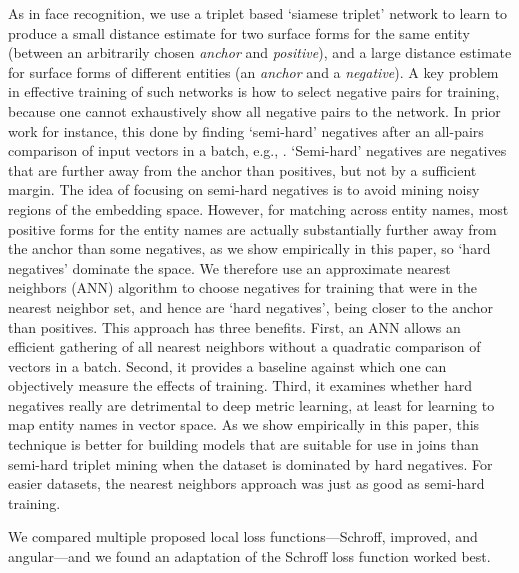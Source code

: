 As in face recognition, we use a triplet based `siamese triplet' network to learn to produce a small distance estimate for two surface forms for the same entity (between an arbitrarily chosen \textit{anchor} and \textit{positive}), and a large distance estimate for surface forms of different entities (an \textit{anchor} and a \textit{negative}).  A key problem in effective training of such networks is how to select negative pairs for training, because one cannot exhaustively show all negative pairs to the network.  In prior work for instance, this done by finding `semi-hard' negatives after an all-pairs comparison of input vectors in a batch, e.g., \cite{DBLP:conf/cvpr/SchroffKP15}.  `Semi-hard' negatives are negatives that are further away from the anchor than positives, but not by a sufficient margin.  The idea of focusing on semi-hard negatives is to avoid mining noisy regions of the embedding space.  However, for matching across entity names, most positive forms for the entity names are actually substantially further away from the anchor than some negatives, as we show empirically in this paper, so `hard negatives' dominate the space.  We therefore use an approximate nearest neighbors (ANN) algorithm to choose negatives for training that were in the nearest neighbor set, and hence are `hard negatives', being closer to the anchor than positives.  This approach has three benefits.  First, an ANN allows an efficient gathering of all nearest neighbors without a quadratic comparison of vectors in a batch.  Second, it provides a baseline against which one can objectively measure the effects of training.  Third, it examines whether hard negatives really are detrimental to deep metric learning, at least for learning to map entity names in vector space.  As we show empirically in this paper, this technique is better for building models that are suitable for use in joins than semi-hard triplet mining when the dataset is dominated by hard negatives.  For easier datasets, the nearest neighbors approach was just as good as semi-hard training.

We compared multiple proposed local loss functions---Schroff\cite{DBLP:conf/cvpr/SchroffKP15}, improved\cite{Zhang:2016:DML:3088616.3088665}, and angular\cite{DBLP:journals/corr/abs-1708-01682}---and we found an adaptation of the Schroff loss function worked best.

